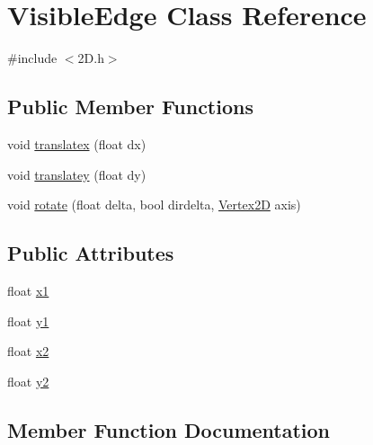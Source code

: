 \hypertarget{class_visible_edge}{}\section{Visible\+Edge Class Reference}
\label{class_visible_edge}


{\ttfamily \#include $<$2\+D.\+h$>$}

\subsection*{Public Member Functions}
\begin{DoxyCompactItemize}
\item 
void \hyperlink{class_visible_edge_a23bff57948310c4245e8861815fb37da}{translatex} (float dx)
\item 
void \hyperlink{class_visible_edge_ad44264fbcda3cd572456f3604fa1fc5d}{translatey} (float dy)
\item 
void \hyperlink{class_visible_edge_acdc2b293c735a19b1f2b8621b3febdb4}{rotate} (float delta, bool dirdelta, \hyperlink{class_vertex2_d}{Vertex2D} axis)
\end{DoxyCompactItemize}
\subsection*{Public Attributes}
\begin{DoxyCompactItemize}
\item 
float \hyperlink{class_visible_edge_a7baae9b2413ae1375d49ff023f272ad3}{x1}
\item 
float \hyperlink{class_visible_edge_ad371a067b7175df3ee9a7672a0f36986}{y1}
\item 
float \hyperlink{class_visible_edge_a6524c696bcd4e189dd393832e95bde4c}{x2}
\item 
float \hyperlink{class_visible_edge_a0e125191d1f182de18ce9dfb35a98d68}{y2}
\end{DoxyCompactItemize}


\subsection{Member Function Documentation}
